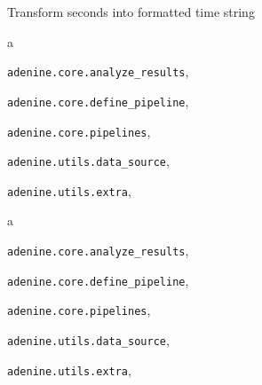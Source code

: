 \documentclass[letterpaper,10pt,english]{sphinxmanual}
\begin{document}
\begin{fulllineitems}
\label{index:adenine.utils.extra.sec_to_time}
Transform seconds into formatted time string

\end{fulllineitems}



\renewcommand{\indexname}{Python Module Index}
\begin{theindex}
\def\bigletter#1{{\Large\sffamily#1}\nopagebreak\vspace{1mm}}
\bigletter{a}
\item {\texttt{adenine.core.analyze\_results}}, \pageref{index:module-adenine.core.analyze_results}
\item {\texttt{adenine.core.define\_pipeline}}, \pageref{index:module-adenine.core.define_pipeline}
\item {\texttt{adenine.core.pipelines}}, \pageref{index:module-adenine.core.pipelines}
\item {\texttt{adenine.utils.data\_source}}, \pageref{index:module-adenine.utils.data_source}
\item {\texttt{adenine.utils.extra}}, \pageref{index:module-adenine.utils.extra}
\end{theindex}
\renewcommand{\indexname}{Python Module Index}
\begin{theindex}
\def\bigletter#1{{\Large\sffamily#1}\nopagebreak\vspace{1mm}}
\bigletter{a}
\item {\texttt{adenine.core.analyze\_results}}, \pageref{index:module-adenine.core.analyze_results}
\item {\texttt{adenine.core.define\_pipeline}}, \pageref{index:module-adenine.core.define_pipeline}
\item {\texttt{adenine.core.pipelines}}, \pageref{index:module-adenine.core.pipelines}
\item {\texttt{adenine.utils.data\_source}}, \pageref{index:module-adenine.utils.data_source}
\item {\texttt{adenine.utils.extra}}, \pageref{index:module-adenine.utils.extra}
\end{theindex}

\renewcommand{\indexname}{Index}
\printindex
\end{document}
